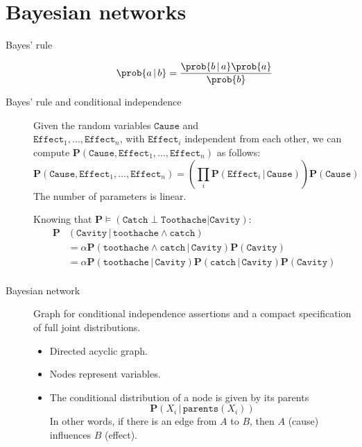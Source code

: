 \section{Bayesian networks}

\begin{description}
    \item[Bayes' rule] 
        \[ \prob{a \,\vert\, b} = \frac{\prob{b \,\vert\, a} \prob{a}}{\prob{b}} \]

    \item[Bayes' rule and conditional independence]
        Given the random variables $\texttt{Cause}$ and\\
        $\texttt{Effect}_1, \dots, \texttt{Effect}_n$, with $\texttt{Effect}_i$ independent from each other,
        we can compute $\textbf{P}(\texttt{Cause}, \texttt{Effect}_1, \dots, \texttt{Effect}_n)$ as follows:
        \[ 
            \textbf{P}(\texttt{Cause}, \texttt{Effect}_1, \dots, \texttt{Effect}_n) = 
            \left(\prod_i \textbf{P}(\texttt{Effect}_i \,\vert\, \texttt{Cause})\right) \textbf{P}(\texttt{Cause})
        \]
        The number of parameters is linear.

        \begin{example}
            Knowing that $\textbf{P} \models (\texttt{Catch} \perp \texttt{Toothache} \vert \texttt{Cavity})$:
            \[
                \begin{split}
                    \textbf{P}&(\texttt{Cavity} \,\vert\, \texttt{toothache} \land \texttt{catch}) \\
                        &= \alpha\textbf{P}(\texttt{toothache} \land \texttt{catch} \,\vert\, \texttt{Cavity})\textbf{P}(\texttt{Cavity}) \\
                        &= \alpha\textbf{P}(\texttt{toothache} \,\vert\, \texttt{Cavity})
                            \textbf{P}(\texttt{catch} \,\vert\, \texttt{Cavity})\textbf{P}(\texttt{Cavity}) \\
                \end{split}
            \]
        \end{example}

    \item[Bayesian network] 
        Graph for conditional independence assertions and a compact specification of full joint distributions.
        \begin{itemize}
            \item Directed acyclic graph.
            \item Nodes represent variables.
            \item The conditional distribution of a node is given by its parents 
                \[ \textbf{P}(X_i \,\vert\, \texttt{parents}(X_i)) \]
                In other words, if there is an edge from $A$ to $B$, then $A$ (cause) influences $B$ (effect).
        \end{itemize}


\end{description}
